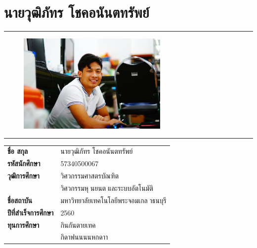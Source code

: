 \section*{นายวุฒิภัทร โชคอนันตทรัพย์}
\hrule height .7pt
\begin{figure}[!ht]
	\centering
	\includegraphics[width=0.65\textwidth]{pages/images/wuttipat.jpg}
\end{figure}
\hrule height .7pt
\raggedright
\begin{tabular}{p{} p{}}
    \textbf{ชื่อ สกุล} & {นายวุฒิภัทร โชคอนันตทรัพย์} \\
    \textbf{รหัสนักศึกษา} & {57340500067}\\
    \textbf{วุฒิการศึกษา} & {วิศวกรรมศาสตรบัณฑิต} \\
    {} & {วิศวกรรมหุนยนตและระบบอัตโนมัติ}\\
    \textbf{ชื่อสถาบัน} & {มหาวิทยาลัยเทคโนโลยีพระจอมเกลาธนบุรี} \\
    \textbf{ปีที่สำเร็จการศึกษา} & {2560} \\
    \textbf{ทุนการศึกษา} & {กินกันตายเทค}\\
    {} & {กิดาฟนนนนหกดาา}\\
\end{tabular}   

